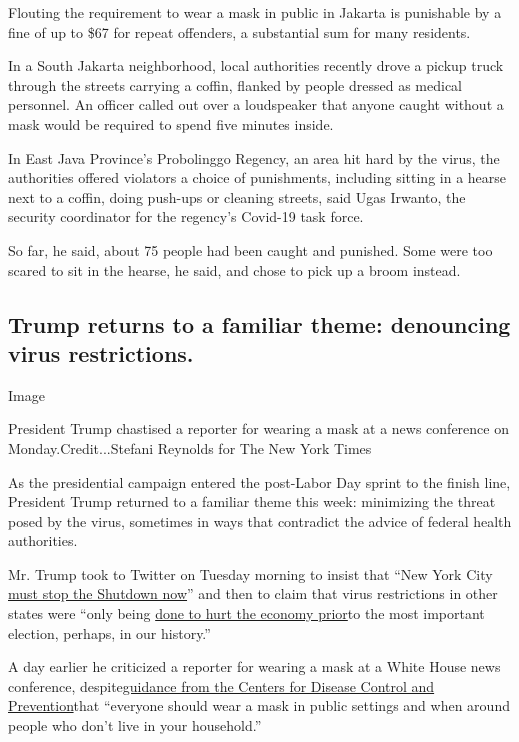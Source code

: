 Flouting the requirement to wear a mask in public in Jakarta is
punishable by a fine of up to \$67 for repeat offenders, a substantial
sum for many residents.

In a South Jakarta neighborhood, local authorities recently drove a
pickup truck through the streets carrying a coffin, flanked by people
dressed as medical personnel. An officer called out over a loudspeaker
that anyone caught without a mask would be required to spend five
minutes inside.

In East Java Province's Probolinggo Regency, an area hit hard by the
virus, the authorities offered violators a choice of punishments,
including sitting in a hearse next to a coffin, doing push-ups or
cleaning streets, said Ugas Irwanto, the security coordinator for the
regency's Covid-19 task force.

So far, he said, about 75 people had been caught and punished. Some were
too scared to sit in the hearse, he said, and chose to pick up a broom
instead.

\hypertarget{trump-returns-to-a-familiar-theme-denouncing-virus-restrictions}{%
\subsection{Trump returns to a familiar theme: denouncing virus
restrictions.}\label{trump-returns-to-a-familiar-theme-denouncing-virus-restrictions}}

Image

President Trump chastised a reporter for wearing a mask at a news
conference on Monday.Credit...Stefani Reynolds for The New York Times

As the presidential campaign entered the post-Labor Day sprint to the
finish line, President Trump returned to a familiar theme this week:
minimizing the threat posed by the virus, sometimes in ways that
contradict the advice of federal health authorities.

Mr. Trump took to Twitter on Tuesday morning to insist that ``New York
City
\href{https://twitter.com/realDonaldTrump/status/1303305303249870854?s=20}{must
stop the Shutdown now}'' and then to claim that virus restrictions in
other states were ``only being
\href{https://twitter.com/realDonaldTrump/status/1303313054281666584?s=20}{done
to hurt the economy prior}to the most important election, perhaps, in
our history.''

A day earlier he criticized a reporter for wearing a mask at a White
House news conference,
despite\href{https://www.cdc.gov/coronavirus/2019-ncov/prevent-getting-sick/prevention.html}{guidance
from the Centers for Disease Control and Prevention}that ``everyone
should wear a mask in public settings and when around people who don't
live in your household.''

